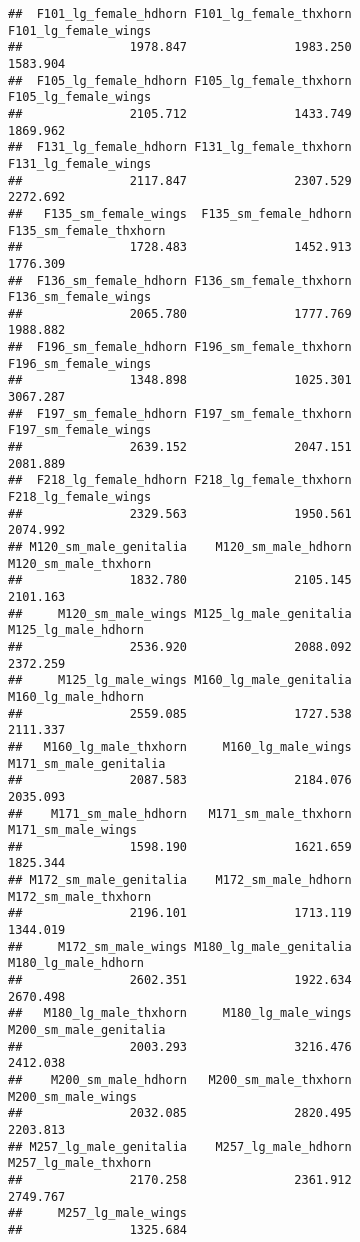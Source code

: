 \documentclass[]{article}
\begin{document}
\begin{verbatim}
##  F101_lg_female_hdhorn F101_lg_female_thxhorn   F101_lg_female_wings 
##               1978.847               1983.250               1583.904 
##  F105_lg_female_hdhorn F105_lg_female_thxhorn   F105_lg_female_wings 
##               2105.712               1433.749               1869.962 
##  F131_lg_female_hdhorn F131_lg_female_thxhorn   F131_lg_female_wings 
##               2117.847               2307.529               2272.692 
##   F135_sm_female_wings  F135_sm_female_hdhorn F135_sm_female_thxhorn 
##               1728.483               1452.913               1776.309 
##  F136_sm_female_hdhorn F136_sm_female_thxhorn   F136_sm_female_wings 
##               2065.780               1777.769               1988.882 
##  F196_sm_female_hdhorn F196_sm_female_thxhorn   F196_sm_female_wings 
##               1348.898               1025.301               3067.287 
##  F197_sm_female_hdhorn F197_sm_female_thxhorn   F197_sm_female_wings 
##               2639.152               2047.151               2081.889 
##  F218_lg_female_hdhorn F218_lg_female_thxhorn   F218_lg_female_wings 
##               2329.563               1950.561               2074.992 
## M120_sm_male_genitalia    M120_sm_male_hdhorn   M120_sm_male_thxhorn 
##               1832.780               2105.145               2101.163 
##     M120_sm_male_wings M125_lg_male_genitalia    M125_lg_male_hdhorn 
##               2536.920               2088.092               2372.259 
##     M125_lg_male_wings M160_lg_male_genitalia    M160_lg_male_hdhorn 
##               2559.085               1727.538               2111.337 
##   M160_lg_male_thxhorn     M160_lg_male_wings M171_sm_male_genitalia 
##               2087.583               2184.076               2035.093 
##    M171_sm_male_hdhorn   M171_sm_male_thxhorn     M171_sm_male_wings 
##               1598.190               1621.659               1825.344 
## M172_sm_male_genitalia    M172_sm_male_hdhorn   M172_sm_male_thxhorn 
##               2196.101               1713.119               1344.019 
##     M172_sm_male_wings M180_lg_male_genitalia    M180_lg_male_hdhorn 
##               2602.351               1922.634               2670.498 
##   M180_lg_male_thxhorn     M180_lg_male_wings M200_sm_male_genitalia 
##               2003.293               3216.476               2412.038 
##    M200_sm_male_hdhorn   M200_sm_male_thxhorn     M200_sm_male_wings 
##               2032.085               2820.495               2203.813 
## M257_lg_male_genitalia    M257_lg_male_hdhorn   M257_lg_male_thxhorn 
##               2170.258               2361.912               2749.767 
##     M257_lg_male_wings 
##               1325.684
\end{verbatim}
\end{document}
